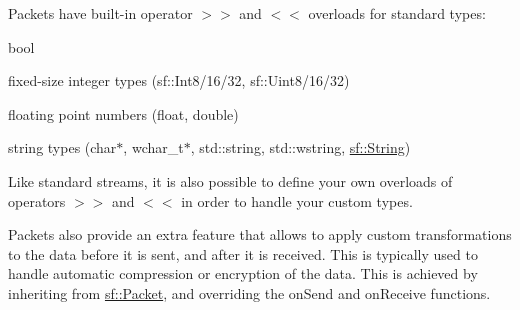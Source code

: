 Packets have built-\/in operator $>$$>$ and $<$$<$ overloads for standard types\+: \begin{DoxyItemize}
\item bool \item fixed-\/size integer types (sf\+::\+Int8/16/32, sf\+::\+Uint8/16/32) \item floating point numbers (float, double) \item string types (char$\ast$, wchar\+\_\+t$\ast$, std\+::string, std\+::wstring, \mbox{\hyperlink{classsf_1_1_string}{sf\+::\+String}})\end{DoxyItemize}
Like standard streams, it is also possible to define your own overloads of operators $>$$>$ and $<$$<$ in order to handle your custom types.


\begin{DoxyCode}{0}
\DoxyCodeLine{\{}
\DoxyCodeLine{\};}
\DoxyCodeLine{}
\DoxyCodeLine{\{}
\DoxyCodeLine{\}}
\DoxyCodeLine{}
\DoxyCodeLine{\{}
\DoxyCodeLine{\}}
\end{DoxyCode}


Packets also provide an extra feature that allows to apply custom transformations to the data before it is sent, and after it is received. This is typically used to handle automatic compression or encryption of the data. This is achieved by inheriting from \mbox{\hyperlink{classsf_1_1_packet}{sf\+::\+Packet}}, and overriding the on\+Send and on\+Receive functions.

